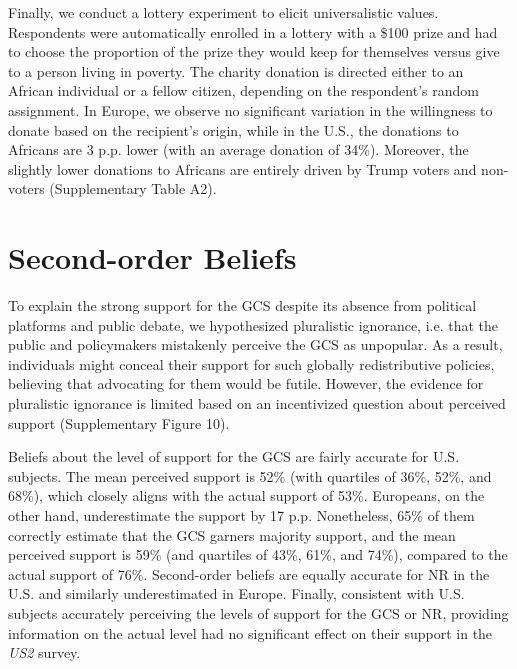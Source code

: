 \documentclass{nature}
\begin{document}
Finally, we conduct a lottery experiment to elicit universalistic values. Respondents were automatically enrolled in a lottery with a \$100 prize and had to choose the proportion of the prize they would keep for themselves versus give to a person living in poverty. The charity donation is directed either to an African individual or a fellow citizen, depending on the respondent's random assignment. In Europe, we observe no significant variation in the willingness to donate based on the recipient's origin, while in the U.S., the donations to Africans are 3 p.p. lower (with an average donation of 34\%). Moreover, the slightly lower donations to Africans are entirely driven by Trump voters and non-voters (Supplementary Table A2).


\section{Second-order Beliefs}\label{subsec:second_order_beliefs}
To explain the strong support for the GCS despite its absence from political platforms and public debate, we hypothesized pluralistic ignorance, i.e. that the public and policymakers mistakenly perceive the GCS as unpopular. As a result, individuals might conceal their support for such globally redistributive policies, believing that advocating for them would be futile. However, the evidence for pluralistic ignorance is limited based on an incentivized question about perceived support (Supplementary Figure 10).

Beliefs about the level of support for the GCS are fairly accurate for U.S. subjects. The mean perceived support is 52\% (with quartiles of 36\%, 52\%, and 68\%), which closely aligns with the actual support of 53\%. Europeans, on the other hand, underestimate the support by 17 p.p. Nonetheless, 65\% of them correctly estimate that the GCS garners majority support, and the mean perceived support is 59\% (and quartiles of 43\%, 61\%, and 74\%), compared to the actual support of 76\%. Second-order beliefs are equally accurate for NR in the U.S. and similarly underestimated in Europe. %
Finally, consistent with U.S. subjects accurately perceiving the levels of support for the GCS or NR, providing information on the actual level had no significant effect on their support in the \textit{US2} survey. %
\end{document}

